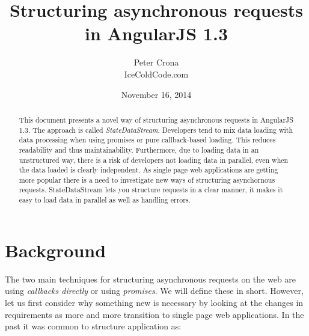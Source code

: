 \documentclass[a4paper,12pt]{article}
\begin{document}
\graphicspath{ {./images/} }

\lstset{
   language=JavaScript,
   extendedchars=true,
   basicstyle=\footnotesize\ttfamily,
   showstringspaces=false,
   showspaces=false,
   numbers=left,
   numberstyle=\footnotesize,
   numbersep=9pt,
   tabsize=2,
   breaklines=true,
   showtabs=false,
   captionpos=b
}

\title{Structuring asynchronous requests in AngularJS 1.3}
\date{November 16, 2014}
\author{Peter Crona\\ IceColdCode.com}
\maketitle

\begin{abstract}
This document presents a novel way of structuring asynchronous requests in AngularJS 1.3. The approach is
called \emph{StateDataStream}. Developers tend to mix data loading with data processing when using promises or pure callback-based loading.
This reduces readability and thus maintainability. Furthermore, due to loading data in an
unstructured way, there is a risk of developers not loading data in parallel, even when the data
loaded is clearly independent. As single page web applications are getting more popular there is a need to investigate new ways of structuring
asynchornous requests.
StateDataStream lets you structure requests in a clear manner, it makes it easy to load
data in parallel as well as handling errors.
\end{abstract}
\clearpage

\afterpage{\null\newpage}
\clearpage

\tableofcontents
\clearpage

\afterpage{\null\newpage}
\clearpage

\section{Background}
The two main techniques for structuring asynchronous requests on the web are using \emph{callbacks directly} or using \emph{promises}.
We will define these in short. However, let us first consider why something new is necessary by looking at the changes in requirements as
more and more transition to single page web applications.
In the past it was common to structure application as:
\end{document}
